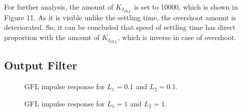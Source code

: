 For further analysis, the amount of $K_I_{PLL}$ is set to 10000, which is shown in Figure 11. As it is visible unlike the settling time, the overshoot amount is deteriorated. So, it can be concluded that speed of settling time has direct proportion with the amount of $K_I_{PLL}$, which is inverse in case of overshoot.


\subsection{Output Filter}

\begin{figure}[ht]
\begin{center}
    \centering
   \nonindent
	\caption[GFL impulse response for $L_1=0.1$ and $L_2=0.1$]{GFL impulse response for $L_1=0.1$ and $L_2=0.1$.}
	\label{res:L1L2(0.1)}
	\end{center}
\end{figure}

\begin{figure}[ht]
\begin{center}
    \centering
   \nonindent
	\caption[GFL impulse response for $L_1=1$ and $L_2=1$]{GFL impulse response for $L_1=1$ and $L_2=1$.}
	\label{res:L1L2(1)}
	\end{center}
\end{figure}


